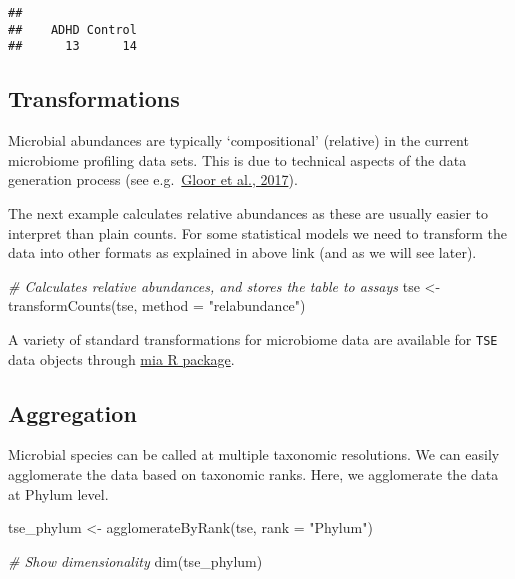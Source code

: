 \documentclass[
]{book}
\newenvironment{Shaded}{\begin{snugshade}}{\end{snugshade}}
\newcommand{\AttributeTok}[1]{\textcolor[rgb]{0.77,0.63,0.00}{#1}}
\newcommand{\CommentTok}[1]{\textcolor[rgb]{0.56,0.35,0.01}{\textit{#1}}}
\newcommand{\FunctionTok}[1]{\textcolor[rgb]{0.00,0.00,0.00}{#1}}
\newcommand{\NormalTok}[1]{#1}
\newcommand{\OtherTok}[1]{\textcolor[rgb]{0.56,0.35,0.01}{#1}}
\newcommand{\StringTok}[1]{\textcolor[rgb]{0.31,0.60,0.02}{#1}}
\begin{document}
\begin{verbatim}
## 
##    ADHD Control 
##      13      14
\end{verbatim}

\hypertarget{transformations}{%
\subsection{Transformations}\label{transformations}}

Microbial abundances are typically `compositional' (relative) in the
current microbiome profiling data sets. This is due to technical
aspects of the data generation process (see e.g.~\href{https://www.frontiersin.org/articles/10.3389/fmicb.2017.02224/full}{Gloor et al.,
2017}).

The next example calculates relative abundances as these are usually easier to
interpret than plain counts. For some statistical models we need to
transform the data into other formats as explained in above link (and
as we will see later).

\begin{Shaded}
\begin{Highlighting}[]
\CommentTok{\# Calculates relative abundances, and stores the table to assays}
\NormalTok{tse }\OtherTok{\textless{}{-}} \FunctionTok{transformCounts}\NormalTok{(tse, }\AttributeTok{method =} \StringTok{"relabundance"}\NormalTok{)}
\end{Highlighting}
\end{Shaded}

A variety of standard transformations for microbiome data are available for \texttt{TSE} data objects through \href{https://microbiome.github.io/mia/reference/transformCounts.html}{mia R package}.

\hypertarget{aggregation}{%
\subsection{Aggregation}\label{aggregation}}

Microbial species can be called at multiple taxonomic resolutions. We
can easily agglomerate the data based on taxonomic ranks. Here, we
agglomerate the data at Phylum level.

\begin{Shaded}
\begin{Highlighting}[]
\NormalTok{tse\_phylum }\OtherTok{\textless{}{-}} \FunctionTok{agglomerateByRank}\NormalTok{(tse, }\AttributeTok{rank =} \StringTok{"Phylum"}\NormalTok{)}

\CommentTok{\# Show dimensionality}
\FunctionTok{dim}\NormalTok{(tse\_phylum)}
\end{Highlighting}
\end{Shaded}
\end{document}
